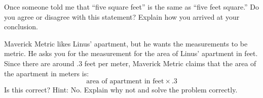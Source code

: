 \begin{prob}
Once someone told me that ``five square feet'' is the same as ``five
feet square.'' Do you agree or disagree with this statement?  Explain
how you arrived at your conclusion.
\end{prob}







\begin{prob}
Maverick Metric likes Linus' apartment, but he wants the measurements
to be metric. He asks you for the measurement for the area of Linus'
apartment in feet. Since there are around $.3$ feet per meter,
Maverick Metric claims that the area of the apartment in meters is:
\[
\text{area of apartment in feet} \times .3 
\]
Is this correct? Hint: No. Explain why not and solve the problem
correctly.
\end{prob}


